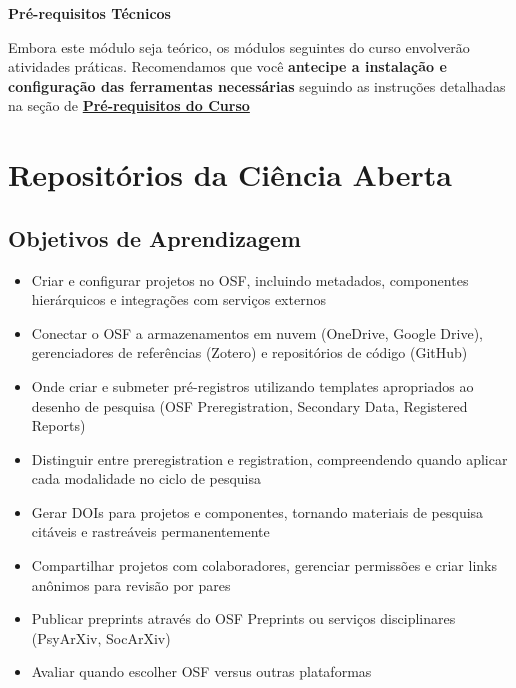 \documentclass[
  a4paper,
]{book}
\providecommand{\tightlist}{%
  \setlength{\itemsep}{0pt}\setlength{\parskip}{0pt}}\usepackage{longtable,booktabs,array}
\newcommand{\emojitext}[1]{{\emoji #1}}
\begin{document}
\begin{tcolorbox}
\textbf{Pré-requisitos Técnicos}

Embora este módulo seja teórico, os módulos seguintes do curso
envolverão atividades práticas. Recomendamos que você \textbf{antecipe a
instalação e configuração das ferramentas necessárias} seguindo as
instruções detalhadas na seção de
\href{https://phdpablo.github.io/curso-open-science/00-prework.html}{\textbf{Pré-requisitos
do Curso}}

\end{tcolorbox}


\chapter{Repositórios da Ciência Aberta}\label{sec-osf}

\section{Objetivos de Aprendizagem}\label{objetivos-de-aprendizagem-1}

\begin{tcolorbox}[enhanced jigsaw, colback=white, toptitle=1mm, opacityback=0, left=2mm, rightrule=.15mm, title={\emojitext{🎯} Ao final deste módulo, você será capaz de:}, coltitle=black, opacitybacktitle=0.6, breakable, toprule=.15mm, bottomtitle=1mm, titlerule=0mm, bottomrule=.15mm, arc=.35mm, leftrule=.75mm, colframe=quarto-callout-tip-color-frame, colbacktitle=quarto-callout-tip-color!10!white]

\begin{itemize}
\tightlist
\item
  Criar e configurar projetos no OSF, incluindo metadados, componentes
  hierárquicos e integrações com serviços externos
\item
  Conectar o OSF a armazenamentos em nuvem (OneDrive, Google Drive),
  gerenciadores de referências (Zotero) e repositórios de código
  (GitHub)
\item
  Onde criar e submeter pré-registros utilizando templates apropriados
  ao desenho de pesquisa (OSF Preregistration, Secondary Data,
  Registered Reports)
\item
  Distinguir entre preregistration e registration, compreendendo quando
  aplicar cada modalidade no ciclo de pesquisa
\item
  Gerar DOIs para projetos e componentes, tornando materiais de pesquisa
  citáveis e rastreáveis permanentemente
\item
  Compartilhar projetos com colaboradores, gerenciar permissões e criar
  links anônimos para revisão por pares
\item
  Publicar preprints através do OSF Preprints ou serviços disciplinares
  (PsyArXiv, SocArXiv)
\item
  Avaliar quando escolher OSF versus outras plataformas
\end{itemize}

\end{tcolorbox}
\end{document}
